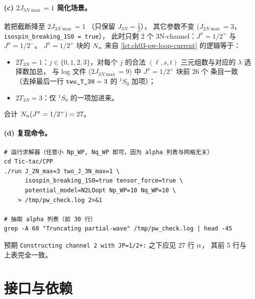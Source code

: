 \begin{numericalbox}[label={box:ch03-numerical-closure}]
\paragraph{(c) \(2J_{3N\max} = 1\) 简化场景。}
若把截断降至 \(2J_{3N\max} = 1\) （只保留 \(J_{3N} = \tfrac{1}{2}\)），
其它参数不变 (\(J_{2N\max} = 3\)，\texttt{isospin\_breaking\_1S0 = true}），
此时只剩 2 个 3N-channel：\(J^\pi = 1/2^+\) 与 \(J^\pi = 1/2^-\)。
\(J^\pi = 1/2^+\) 块的 \(N_\alpha\) 来自 \cref{lst:ch03-pw-loop-current} 的逻辑等于：
\begin{itemize}
  \item \(2T_{3N} = 1\)：\(j \in \{0,1,2,3\}\)，对每个 \(j\) 的合法
        \((\ell, s, t)\) 三元组数与对应的 \(\lambda\) 选择数加总，
        与 log 文件 (\(2J_{3N\max} = 9\)) 中 \(J^\pi = 1/2^+\) 块前 26 个
        条目一致（去掉最后一行 \(\verb|two_T_3N|=3\) 的 \({}^1S_0\) 加项）；
  \item \(2T_{3N} = 3\)：仅 \({}^1S_0\) 的一项加进来。
\end{itemize}
合计 \(N_\alpha(J^\pi = 1/2^+) = 27\)。

\paragraph{(d) 复现命令。}
\begin{lstlisting}[style=config]
# 运行求解器（任意小 Np_WP, Nq_WP 即可，因为 alpha 列表与网格无关）
cd Tic-tac/CPP
./run J_2N_max=3 two_J_3N_max=1 \
      isospin_breaking_1S0=true tensor_force=true \
      potential_model=N2LOopt Np_WP=10 Nq_WP=10 \
    > /tmp/pw_check.log 2>&1

# 抽取 alpha 列表（前 30 行）
grep -A 60 "Truncating partial-wave" /tmp/pw_check.log | head -45
\end{lstlisting}
预期 \texttt{Constructing channel 2 with JP=1/2+:} 之下应见 27 行 \(\alpha\)，
其前 5 行与上表完全一致。

\end{numericalbox}

\section{接口与依赖}
\label{sec:ch03-interface}

